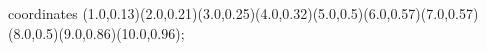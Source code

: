 					coordinates { (1.0,0.13)(2.0,0.21)(3.0,0.25)(4.0,0.32)(5.0,0.5)(6.0,0.57)(7.0,0.57)(8.0,0.5)(9.0,0.86)(10.0,0.96)};